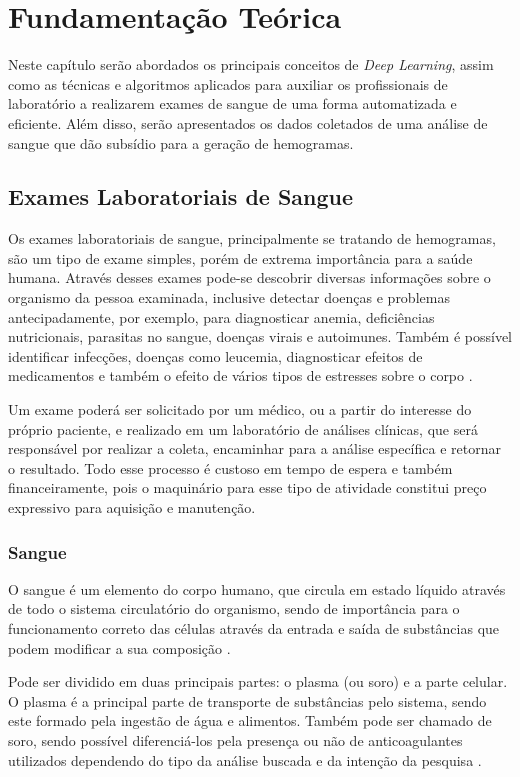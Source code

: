 \chapter{Fundamentação Teórica}
\label{chap:fund}

Neste capítulo serão abordados os principais conceitos de \emph{Deep Learning}, assim como as técnicas e algoritmos aplicados para auxiliar os profissionais de laboratório a realizarem exames de sangue de uma forma automatizada e eficiente. Além disso, serão apresentados os dados coletados de uma análise de sangue que dão subsídio para a geração de hemogramas.

\section{Exames Laboratoriais de Sangue}
\label{sec:conceito1}
Os exames laboratoriais de sangue, principalmente se tratando de hemogramas, são um tipo de exame simples, porém de extrema importância para a saúde humana. Através desses exames pode-se descobrir diversas informações sobre o organismo da pessoa examinada, inclusive detectar doenças e problemas antecipadamente, por exemplo, para diagnosticar anemia, deficiências nutricionais, parasitas no sangue, doenças virais e autoimunes. Também é possível identificar infecções, doenças como leucemia, diagnosticar efeitos de medicamentos e também o efeito de vários tipos de estresses sobre o corpo \cite{abcOfCbc, atlasDeHematologiaEAnalise}.

Um exame poderá ser solicitado por um médico, ou a partir do interesse do próprio paciente, e realizado em um laboratório de análises clínicas, que será responsável por realizar a coleta, encaminhar para a análise específica e retornar o resultado. Todo esse processo é custoso em tempo de espera e também financeiramente, pois o maquinário para esse tipo de atividade constitui preço expressivo para aquisição e manutenção.

\subsection{Sangue}
O sangue é um elemento do corpo humano, que circula em estado líquido através de todo o sistema circulatório do organismo, sendo de importância para o funcionamento correto das células através da entrada e saída de substâncias que podem modificar a sua composição \cite{manualHematologia}.

Pode ser dividido em duas principais partes: o plasma (ou soro) e a parte celular. O plasma é a principal parte de transporte de substâncias pelo sistema, sendo este formado pela ingestão de água e alimentos. Também pode ser chamado de soro, sendo possível diferenciá-los pela presença ou não de anticoagulantes utilizados dependendo do tipo da análise buscada e da intenção da pesquisa \cite{manualHematologia}.

